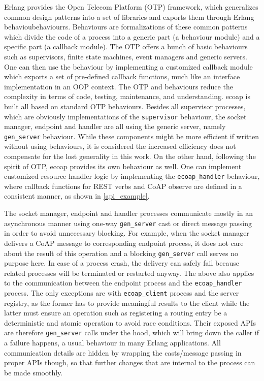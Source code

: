 Erlang provides the Open Telecom Platform (OTP) framework, which generalizes common design patterns into a set of libraries and exports them through Erlang behavioubehaviourrs. Behaviours are formalizations of these common patterns which divide the code of a process into a generic part (a behaviour module) and a specific part (a callback module). The OTP offers a bunch of basic behaviours such as supervisors, finite state machines, event managers and generic servers. One can then use the behaviour by implementing a customized callback module which exports a set of pre-defined callback functions, much like an interface implementation in an OOP context. The OTP and behaviours reduce the complexity in terms of code, testing, maintenance, and understanding. ecoap is built all based on standard OTP behaviours. Besides all supervisor processes, which are obviously implementations of the \verb|supervisor| behaviour, the socket manager, endpoint and handler are all using the generic server, namely \verb|gen_server| behaviour. While these components might be more efficient if written without using behaviours, it is considered the increased efficiency does not compensate for the lost generality in this work. On the other hand, following the spirit of OTP, ecoap provides its own behaviour as well. One can implement customized resource handler logic by implementing the \verb|ecoap_handler| behaviour, where callback functions for REST verbs and CoAP observe are defined in a consistent manner, as shown in \autoref{api_example}.

The socket manager, endpoint and handler processes communicate mostly in an asynchronous manner using one-way \verb|gen_server| cast or direct message passing in order to avoid unnecessary blocking. For example, when the socket manager delivers a CoAP message to corresponding endpoint process, it does not care about the result of this operation and a blocking \verb|gen_server| call serves no purpose here. In case of a process crash, the delivery can safely fail because related processes will be terminated or restarted anyway. The above also applies to the communication between the endpoint process and the \verb|ecoap_handler| process. The only exceptions are with \verb|ecoap_client| process and the server registry, as the former has to provide meaningful results to the client while the latter must ensure an operation such as registering a routing entry be a deterministic and atomic operation to avoid race conditions. Their exposed APIs are therefore \verb|gen_server| calls under the hood, which will bring down the caller if a failure happens, a usual behaviour in many Erlang applications. All communication details are hidden by wrapping the casts/message passing in proper APIs though, so that further changes that are internal to the process can be made smoothly. 

